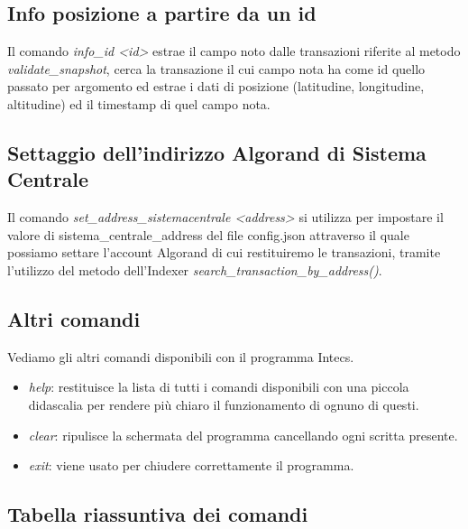 \subsection{Info posizione a partire da un id}
Il comando \textit{info\_id <id>} estrae il campo noto dalle transazioni riferite al metodo \textit{validate\_snapshot}, cerca la transazione il cui campo nota ha come id quello passato per argomento ed estrae i dati di posizione (latitudine, longitudine, altitudine) ed il timestamp di quel campo nota.

\subsection{Settaggio dell'indirizzo Algorand di Sistema Centrale}
Il comando \textit{set\_address\_sistemacentrale <address>} si utilizza per impostare il valore di sistema\_centrale\_address del file config.json attraverso il quale possiamo settare l'account Algorand di cui restituiremo le transazioni, tramite l'utilizzo del metodo dell'Indexer \textit{search\_transaction\_by\_address()}.

\subsection{Altri comandi}
Vediamo gli altri comandi disponibili con il programma Intecs.
\begin{itemize}
    \item \textit{help}: restituisce la lista di tutti i comandi disponibili con una piccola didascalia per rendere più chiaro il funzionamento di ognuno di questi.
    \item \textit{clear}: ripulisce la schermata del programma cancellando ogni scritta presente.
    \item \textit{exit}: viene usato per chiudere correttamente il programma.
\end{itemize}

\subsection{Tabella riassuntiva dei comandi}


